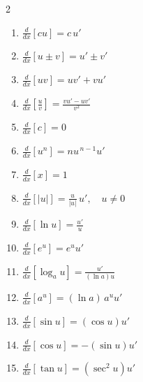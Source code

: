 \documentclass[12pt, letterpaper]{article}
\begin{document}
\begin{definition}[title=Basic Differentiation Rules for Elementary Functions]
    \setlength{\columnsep}{1cm}
    \begin{multicols}{2}
        \begin{enumerate}
        \item $\displaystyle \frac{d}{dx}[cu] = c\,u'$
        
        \item $\displaystyle \frac{d}{dx}[u \pm v] = u' \pm v'$
        
        \item $\displaystyle \frac{d}{dx}[uv] = u v' + v u'$
        
        \item $\displaystyle \frac{d}{dx}\!\left[\frac{u}{v}\right]
        = \frac{v u' - u v'}{v^{2}}$
        
        \item $\displaystyle \frac{d}{dx}[c] = 0$
        
        \item $\displaystyle \frac{d}{dx}[u^{n}] = n u^{\,n-1} u'$
        
        \item $\displaystyle \frac{d}{dx}[x] = 1$
        
        \item $\displaystyle \frac{d}{dx}[|u|] = \frac{u}{|u|}\,u',
        \quad u \neq 0$
        
        \item $\displaystyle \frac{d}{dx}[\ln u] = \frac{u'}{u}$
        
        \item $\displaystyle \frac{d}{dx}[e^{u}] = e^{u}u'$
        
        \item $\displaystyle \frac{d}{dx}[\log_a u]
        = \frac{u'}{(\ln a)u}$
        
        \item $\displaystyle \frac{d}{dx}[a^{u}]
        = (\ln a)\,a^{u}u'$
        
        \item $\displaystyle \frac{d}{dx}[\sin u]
        = (\cos u)u'$
        
        \item $\displaystyle \frac{d}{dx}[\cos u]
        = -(\sin u)u'$
        
        \item $\displaystyle \frac{d}{dx}[\tan u]
        = (\sec^{2}u)u'$
        

\end{enumerate}
\end{multicols}
\end{definition}
\end{document}
